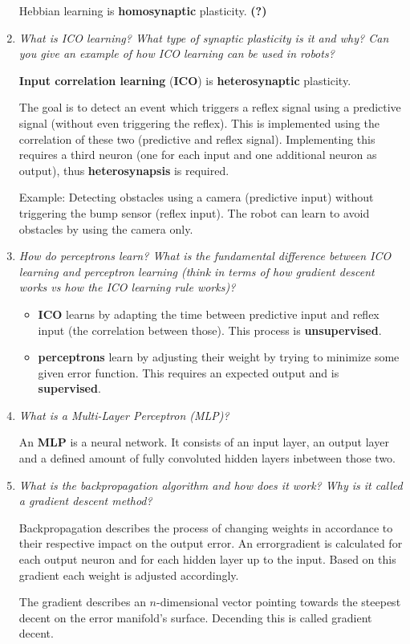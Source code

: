 \documentclass[
    fontsize      = 11pt,
    paper         = a4,
    twoside       = false,
    parskip       = half,
    pagesize      = false,
]{scrartcl}
\providecommand{\tightlist}{%
  \setlength{\itemsep}{0pt}\setlength{\parskip}{0pt}}
\begin{document}
\begin{enumerate}
  Hebbian learning is \textbf{homosynaptic} plasticity. \textbf{(?)}
\item
  \emph{What is ICO learning? What type of synaptic plasticity is it and
  why? Can you give an example of how ICO learning can be used in
  robots?}

  \textbf{Input correlation learning} (\textbf{ICO}) is
  \textbf{heterosynaptic} plasticity.

  The goal is to detect an event which triggers a reflex signal using a
  predictive signal (without even triggering the reflex). This is
  implemented using the correlation of these two (predictive and reflex
  signal). Implementing this requires a third neuron (one for each input
  and one additional neuron as output), thus \textbf{heterosynapsis} is
  required.

  Example: Detecting obstacles using a camera (predictive input) without
  triggering the bump sensor (reflex input). The robot can learn to
  avoid obstacles by using the camera only.
\item
  \emph{How do perceptrons learn? What is the fundamental difference
  between ICO learning and perceptron learning (think in terms of how
  gradient descent works vs how the ICO learning rule works)?}

  \begin{itemize}
  \tightlist
  \item
    \textbf{ICO} learns by adapting the time between predictive input
    and reflex input (the correlation between those). This process is
    \textbf{unsupervised}.
  \item
    \textbf{perceptrons} learn by adjusting their weight by trying to
    minimize some given error function. This requires an expected output
    and is \textbf{supervised}.
  \end{itemize}
\item
  \emph{What is a Multi-Layer Perceptron (MLP)?}

  An \textbf{MLP} is a neural network. It consists of an input layer, an
  output layer and a defined amount of fully convoluted hidden layers
  inbetween those two.
\item
  \emph{What is the backpropagation algorithm and how does it work? Why
  is it called a gradient descent method?}

  Backpropagation describes the process of changing weights in
  accordance to their respective impact on the output error. An
  errorgradient is calculated for each output neuron and for each hidden
  layer up to the input. Based on this gradient each weight is adjusted
  accordingly.

  The gradient describes an \(n\)-dimensional vector pointing towards
  the steepest decent on the error manifold's surface. Decending this is
  called gradient decent.
\end{enumerate}

\clearpage
\newpage
\end{document}
